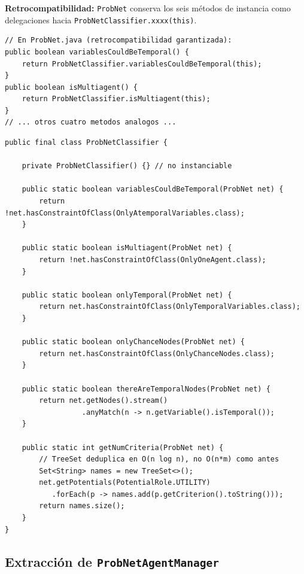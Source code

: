\documentclass[11pt,a4paper]{article}
\newcommand{\code}[1]{\texttt{#1}}
\begin{document}
\textbf{Retrocompatibilidad:} \code{ProbNet} conserva los seis métodos de
instancia como delegaciones hacia \code{ProbNetClassifier.xxxx(this)}.

\begin{lstlisting}[caption={Delegaciones en \texttt{ProbNet} después de la extracción.},
                   label=lst:classifier-deleg]
// En ProbNet.java (retrocompatibilidad garantizada):
public boolean variablesCouldBeTemporal() {
    return ProbNetClassifier.variablesCouldBeTemporal(this);
}
public boolean isMultiagent() {
    return ProbNetClassifier.isMultiagent(this);
}
// ... otros cuatro metodos analogos ...
\end{lstlisting}

\begin{lstlisting}[caption={Implementación completa de \texttt{ProbNetClassifier}.},
                   label=lst:classifier-impl]
public final class ProbNetClassifier {

    private ProbNetClassifier() {} // no instanciable

    public static boolean variablesCouldBeTemporal(ProbNet net) {
        return !net.hasConstraintOfClass(OnlyAtemporalVariables.class);
    }

    public static boolean isMultiagent(ProbNet net) {
        return !net.hasConstraintOfClass(OnlyOneAgent.class);
    }

    public static boolean onlyTemporal(ProbNet net) {
        return net.hasConstraintOfClass(OnlyTemporalVariables.class);
    }

    public static boolean onlyChanceNodes(ProbNet net) {
        return net.hasConstraintOfClass(OnlyChanceNodes.class);
    }

    public static boolean thereAreTemporalNodes(ProbNet net) {
        return net.getNodes().stream()
                  .anyMatch(n -> n.getVariable().isTemporal());
    }

    public static int getNumCriteria(ProbNet net) {
        // TreeSet deduplica en O(n log n), no O(n*m) como antes
        Set<String> names = new TreeSet<>();
        net.getPotentials(PotentialRole.UTILITY)
           .forEach(p -> names.add(p.getCriterion().toString()));
        return names.size();
    }
}
\end{lstlisting}

\subsection{Extracción de \texttt{ProbNetAgentManager}}
\label{sec:agentmanager}
\end{document}

